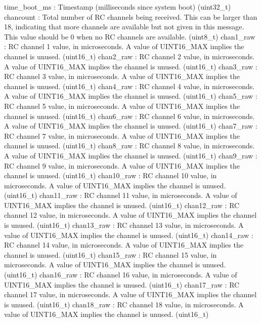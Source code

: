 \begin{DoxyVerb}
\begin{DoxyVerb}
\begin{DoxyVerb}
\begin{DoxyVerb}
\begin{DoxyVerb}
\begin{DoxyVerb}
\begin{DoxyVerb}
\begin{DoxyVerb}
\begin{DoxyVerb}
\begin{DoxyVerb}
time_boot_ms              : Timestamp (milliseconds since system boot) (uint32_t)
chancount                 : Total number of RC channels being received. This can be larger than 18, indicating that more channels are available but not given in this message. This value should be 0 when no RC channels are available. (uint8_t)
chan1_raw                 : RC channel 1 value, in microseconds. A value of UINT16_MAX implies the channel is unused. (uint16_t)
chan2_raw                 : RC channel 2 value, in microseconds. A value of UINT16_MAX implies the channel is unused. (uint16_t)
chan3_raw                 : RC channel 3 value, in microseconds. A value of UINT16_MAX implies the channel is unused. (uint16_t)
chan4_raw                 : RC channel 4 value, in microseconds. A value of UINT16_MAX implies the channel is unused. (uint16_t)
chan5_raw                 : RC channel 5 value, in microseconds. A value of UINT16_MAX implies the channel is unused. (uint16_t)
chan6_raw                 : RC channel 6 value, in microseconds. A value of UINT16_MAX implies the channel is unused. (uint16_t)
chan7_raw                 : RC channel 7 value, in microseconds. A value of UINT16_MAX implies the channel is unused. (uint16_t)
chan8_raw                 : RC channel 8 value, in microseconds. A value of UINT16_MAX implies the channel is unused. (uint16_t)
chan9_raw                 : RC channel 9 value, in microseconds. A value of UINT16_MAX implies the channel is unused. (uint16_t)
chan10_raw                : RC channel 10 value, in microseconds. A value of UINT16_MAX implies the channel is unused. (uint16_t)
chan11_raw                : RC channel 11 value, in microseconds. A value of UINT16_MAX implies the channel is unused. (uint16_t)
chan12_raw                : RC channel 12 value, in microseconds. A value of UINT16_MAX implies the channel is unused. (uint16_t)
chan13_raw                : RC channel 13 value, in microseconds. A value of UINT16_MAX implies the channel is unused. (uint16_t)
chan14_raw                : RC channel 14 value, in microseconds. A value of UINT16_MAX implies the channel is unused. (uint16_t)
chan15_raw                : RC channel 15 value, in microseconds. A value of UINT16_MAX implies the channel is unused. (uint16_t)
chan16_raw                : RC channel 16 value, in microseconds. A value of UINT16_MAX implies the channel is unused. (uint16_t)
chan17_raw                : RC channel 17 value, in microseconds. A value of UINT16_MAX implies the channel is unused. (uint16_t)
chan18_raw                : RC channel 18 value, in microseconds. A value of UINT16_MAX implies the channel is unused. (uint16_t)

\end{DoxyVerb}
\end{DoxyVerb}
\end{DoxyVerb}
\end{DoxyVerb}
\end{DoxyVerb}
\end{DoxyVerb}
\end{DoxyVerb}
\end{DoxyVerb}
\end{DoxyVerb}
\end{DoxyVerb}
